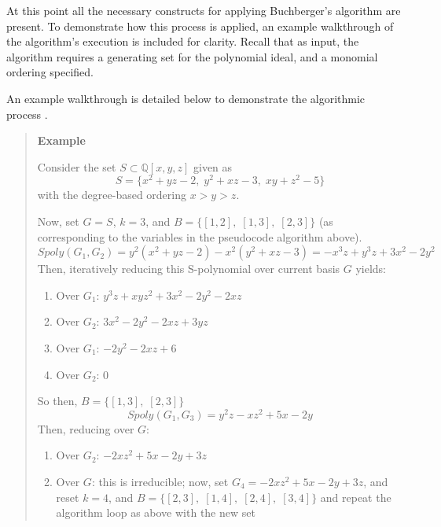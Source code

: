 \documentclass[letterpaper,12pt,titlepage,oneside,final]{book}
\newenvironment{example}{\begin{quote}%
  \textbf{Example }%
  \quad
}{%
\end{quote}%
}
\begin{document}
At this point all the necessary constructs for applying Buchberger's algorithm are present.  To demonstrate how this process is applied, an example walkthrough of the algorithm's execution is included for clarity.  Recall that as input, the algorithm requires a generating set for the polynomial ideal, and a monomial ordering specified.

An example walkthrough is detailed below to demonstrate the algorithmic process \cite{CN}.

\begin{example} 
  Consider the set ${S \subset \mathbb{Q}[x, y, z]}$ given as
  \begin{equation*}
    S = \{x^2 + yz - 2, \; y^2 + xz - 3, \; xy + z^2 - 5\}
  \end{equation*}
  with the degree-based ordering ${x > y > z}$.  

  Now, set ${G = S}$, ${k = 3}$, and ${B = \{[1, 2],\; [1, 3],\; [2, 3]\}}$ (as corresponding to the variables in the pseudocode algorithm above).  
  \begin{equation*}
    Spoly( G_1, G_2) = y^2(x^2 + yz - 2) - x^2(y^2 + xz - 3) = -x^3z + y^3z + 3x^2 -2y^2
  \end{equation*}
  Then, iteratively reducing this S-polynomial over current basis ${G}$ yields:\\ 
  \begin{enumerate}
    \item Over ${G_1}$: ${y^3z + xyz^2 + 3x^2 -2y^2 - 2xz}$
    \item Over ${G_2}$: ${3x^2 - 2y^2 - 2xz + 3yz}$
    \item Over ${G_1}$: ${-2y^2 - 2xz + 6}$
    \item Over ${G_2}$: 0
  \end{enumerate}
  So then, ${B = \{[1, 3],\; [2, 3]\}}$
  \begin{equation*}
    Spoly( G_1, G_3) = y^2z - xz^2 + 5x - 2y
  \end{equation*} 
  Then, reducing over ${G}$: 
  \begin{enumerate}
    \item Over ${G_2}$: ${-2xz^2 + 5x - 2y + 3z}$
    \item Over ${G}$: this is irreducible; now, set ${G_4 = -2xz^2 + 5x - 2y + 3z}$, and reset ${k = 4}$, and ${B = \{[2, 3],\; [1, 4],\; [2, 4],\; [3, 4]\}}$ and repeat the algorithm loop as above with the new set
  \end{enumerate}
  

\end{example}
\end{document}
